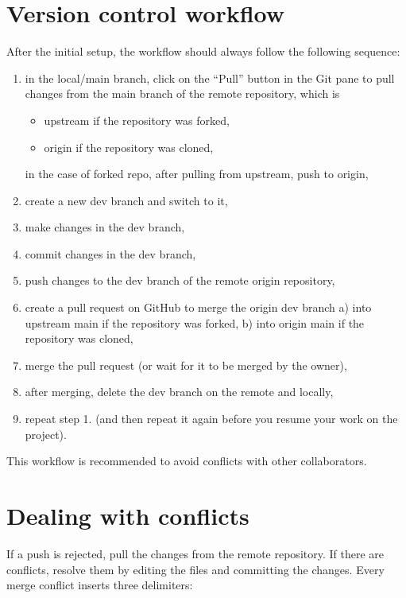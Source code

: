 \documentclass[
  letterpaper,
  DIV=11,
  numbers=noendperiod]{scrreport}
\providecommand{\tightlist}{%
  \setlength{\itemsep}{0pt}\setlength{\parskip}{0pt}}\usepackage{longtable,booktabs,array}
\begin{document}
\section{Version control workflow}\label{version-control-workflow}

After the initial setup, the workflow should always follow the following
sequence:

\begin{enumerate}
\def\labelenumi{\arabic{enumi}.}
\item
  in the local/main branch, click on the ``Pull'' button in the Git pane
  to pull changes from the main branch of the remote repository, which
  is

  \begin{itemize}
  \tightlist
  \item
    upstream if the repository was forked,
  \item
    origin if the repository was cloned,
  \end{itemize}

  in the case of forked repo, after pulling from upstream, push to
  origin,
\item
  create a new dev branch and switch to it,
\item
  make changes in the dev branch,
\item
  commit changes in the dev branch,
\item
  push changes to the dev branch of the remote origin repository,
\item
  create a pull request on GitHub to merge the origin dev branch a) into
  upstream main if the repository was forked, b) into origin main if the
  repository was cloned,
\item
  merge the pull request (or wait for it to be merged by the owner),
\item
  after merging, delete the dev branch on the remote and locally,
\item
  repeat step 1. (and then repeat it again before you resume your work
  on the project).
\end{enumerate}

This workflow is recommended to avoid conflicts with other
collaborators.

\section{Dealing with conflicts}\label{dealing-with-conflicts}

If a push is rejected, pull the changes from the remote repository. If
there are conflicts, resolve them by editing the files and committing
the changes. Every merge conflict inserts three delimiters:
\end{document}
